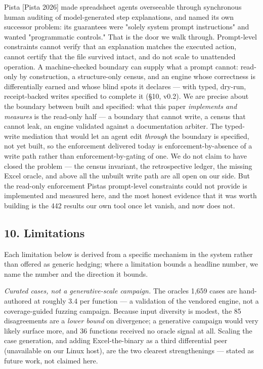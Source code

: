 \documentclass[
]{article}
\begin{document}
Pista {[}Pista 2026{]} made spreadsheet agents overseeable through
synchronous human auditing of model-generated step explanations, and
named its own successor problem: its guarantees were "solely system
prompt instructions" and wanted "programmatic controls." That is the
door we walk through. Prompt-level constraints cannot verify that an
explanation matches the executed action, cannot certify that the file
survived intact, and do not scale to unattended operation. A
machine-checked boundary can supply what a prompt cannot: read-only by
construction, a structure-only census, and an engine whose correctness
is differentially earned and whose blind spots it declares --- with
typed, dry-run, receipt-backed writes specified to complete it (§10,
v0.2). We are precise about the boundary between built and specified:
what this paper \emph{implements and measures} is the read-only half ---
a boundary that cannot write, a census that cannot leak, an engine
validated against a documentation arbiter. The typed-write mediation
that would let an agent edit \emph{through} the boundary is specified,
not yet built, so the enforcement delivered today is
enforcement-by-absence of a write path rather than enforcement-by-gating
of one. We do not claim to have closed the problem --- the census
invariant, the retrospective ledger, the missing Excel oracle, and above
all the unbuilt write path are all open on our side. But the read-only
enforcement Pista\textquotesingle s prompt-level constraints could not
provide is implemented and measured here, and the most honest evidence
that it was worth building is the 442 results our own tool once let
vanish, and now does not.

\subsection{10. Limitations}\label{10-limitations}

Each limitation below is derived from a specific mechanism in the system
rather than offered as generic hedging; where a limitation bounds a
headline number, we name the number and the direction it bounds.

\emph{Curated cases, not a generative-scale campaign.} The
oracle\textquotesingle s 1,659 cases are hand-authored at roughly 3.4
per function --- a validation of the vendored engine, not a
coverage-guided fuzzing campaign. Because input diversity is modest, the
85 disagreements are a \emph{lower bound} on divergence; a generative
campaign would very likely surface more, and 36 functions received no
oracle signal at all. Scaling the case generation, and adding
Excel-the-binary as a third differential peer (unavailable on our Linux
host), are the two clearest strengthenings --- stated as future work,
not claimed here.
\end{document}
